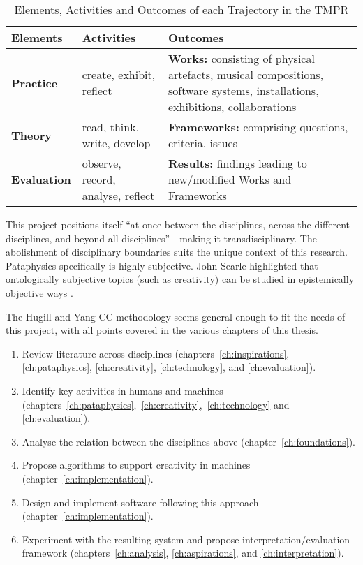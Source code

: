 \begin{table}[!htbp]
\caption[Elements, Activities and Outcomes of the TMPR]{Elements, Activities and Outcomes of each Trajectory in the TMPR}
\label{tab:tmpr}
  \begin{tabu}{X[1]X[2]X[3]}
  \toprule
  \textbf{Elements}
  &
  \textbf{Activities}
  &
  \textbf{Outcomes}
  \\ \midrule
  \textbf{Practice}
  &
  create, exhibit, reflect
  &
  \textbf{Works:} consisting of physical artefacts, musical compositions, software systems, installations, exhibitions, collaborations
  \\ \midrule
  \textbf{Theory}
  &
  read, think, write, develop
  &
  \textbf{Frameworks:} comprising questions, criteria, issues
  \\ \midrule
  \textbf{Evaluation}
  &
  observe, record, analyse, reflect
  &
  \textbf{Results:} findings leading to new/modified Works and Frameworks
  \\ \bottomrule
  \end{tabu}
\end{table}

\spirals

This project positions itself ``at once between the disciplines, across the different disciplines, and beyond all disciplines''---making it transdisciplinary. The abolishment of disciplinary boundaries suits the unique context of this research. Pataphysics specifically is highly subjective. John Searle highlighted that ontologically subjective topics (such as creativity) can be studied in epistemically objective ways \citeyear{Searle2015}.

The Hugill and Yang \ac{CC} methodology seems general enough to fit the needs of this project, with all points covered in the various chapters of this thesis.

\begin{enumerate}
  \item Review literature across disciplines (chapters~\ref{ch:inspirations}, \ref{ch:pataphysics}, \ref{ch:creativity}, \ref{ch:technology}, and \ref{ch:evaluation}).
  \item Identify key activities in humans and machines (chapters~\ref{ch:pataphysics},~\ref{ch:creativity},~\ref{ch:technology} and \ref{ch:evaluation}).
  \item Analyse the relation between the disciplines above (chapter~\ref{ch:foundations}).
  \item Propose algorithms to support creativity in machines (chapter~\ref{ch:implementation}).
  \item Design and implement software following this approach (chapter~\ref{ch:implementation}).
  \item Experiment with the resulting system and propose interpretation/evaluation framework (chapters~\ref{ch:analysis}, \ref{ch:aspirations}, and \ref{ch:interpretation}).
\end{enumerate}

